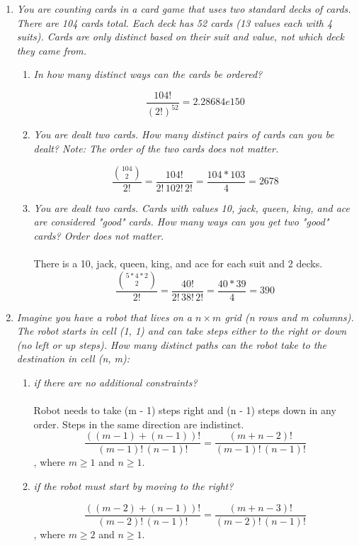 \documentclass{article} %
\begin{document}
\begin{enumerate}
	\item \textit{You are counting cards in a card game that uses two standard decks of cards. There are 104 cards total. Each deck has 52 cards (13 values each with 4 suits). Cards are only distinct based on their suit and value, not which deck they came from.}
	\begin{enumerate}
		\item \textit{In how many distinct ways can the cards be ordered?}
		
		$$\frac{104!}{(2!)^{52}} = 2.28684e150$$
		
		\item \textit{You are dealt two cards. How many distinct pairs of cards can you be dealt? Note: The order of the two cards does not matter.}
		
		$$\frac{\binom{104}{2}}{2!} = \frac{104!}{2!\,102!\,2!} = \frac{104*103}{4} = 2678$$
		
		\item \textit{You are dealt two cards. Cards with values 10, jack, queen, king, and ace are considered "good" cards. How many ways can you get two "good" cards? Order does not matter.}\\
		\\
		There is a 10, jack, queen, king, and ace for each suit and 2 decks. $$\frac{\binom{5*4*2}{2}}{2!} = \frac{40!}{2!\,38!\,2!} = \frac{40*39}{4} = 390$$
	
	\end{enumerate}
	
	\item \textit{Imagine you have a robot that lives on a $n \times m$ grid (n rows and m columns). The robot starts in cell (1, 1) and can take steps either to the right or down (no left or up steps). How many distinct paths can the robot take to the destination in cell (n, m):}
	\begin{enumerate}
		\item \textit{if there are no additional constraints?}\\
		\\
		Robot needs to take (m - 1) steps right and (n - 1) steps down in any order. Steps in the same direction are indistinct. $$\frac{((m - 1) + (n - 1))!}{(m - 1)!\,(n - 1)!} = \frac{(m + n - 2)!}{(m - 1)!\,(n - 1)!}$$
		, where $m \geq 1$ and $n \geq 1$.
		
		\item \textit{if the robot must start by moving to the right?}
		
		$$\frac{((m - 2) + (n - 1))!}{(m - 2)!\,(n - 1)!} = \frac{(m + n - 3)!}{(m - 2)!\,(n - 1)!}$$
		, where $m \geq 2$ and $n \geq 1$.
		

\end{enumerate}
\end{enumerate}
\end{document}
